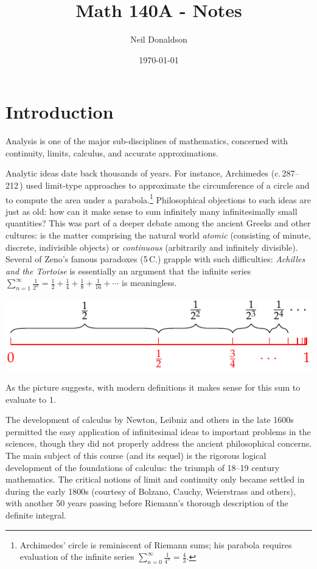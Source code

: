 \graphicspath{{1complete/asy/}}

\title{Math 140A - Notes}
\author{Neil Donaldson}
\date{\today}
\maketitle

\thispagestyle{empty}

\section*{Introduction}

Analysis is one of the major sub-disciplines of mathematics, concerned with continuity, limits, calculus, and accurate approximations.
\smallbreak

Analytic ideas date back thousands of years. For instance, Archimedes (c.\,287--212\,\BC) used limit-type approaches to approximate the circumference of a circle and to compute the area under a parabola.\footnote{%
	Archimedes' circle is reminiscent of Riemann sums; his parabola requires evaluation of the infinite series $\sum\limits_{n=0}^\infty \frac 1{4^n}=\frac 43$.%
}
Philosophical objections to such ideas are just as old: how can it make sense to sum infinitely many infinitesimally small quantities? This was part of a deeper debate among the ancient Greeks and other cultures: is the matter comprising the natural world \emph{atomic} (consisting of minute, discrete, indivisible objects) or \emph{continuous} (arbitrarily and infinitely divisible). Several of Zeno's famous paradoxes (5\th\,C.{}\BC) grapple with such difficulties: \emph{Achilles and the Tortoise} is essentially an argument that the infinite series $\sum\limits_{n=1}^\infty \frac 1{2^n}=\frac 12+\frac 14+\frac 18+\frac 1{16}+\cdots$ is meaningless.
\begin{center}
	\includegraphics{zeno-jump}
\end{center}
As the picture suggests, with modern definitions it makes sense for this sum to evaluate to 1.
\smallbreak

The development of calculus by Newton, Leibniz and others in the late 1600s permitted the easy application of infinitesimal ideas to important problems in the sciences, though they did not properly address the ancient philosophical concerns. The main subject of this course (and its sequel) is the rigorous logical development of the foundations of calculus: the triumph of 18\th--19\th{} century mathematics. The critical notions of limit and continuity only became settled in during the early 1800s (courtesy of Bolzano, Cauchy, Weierstrass and others), with another 50 years passing before Riemann's thorough description of the definite integral.
\medbreak

